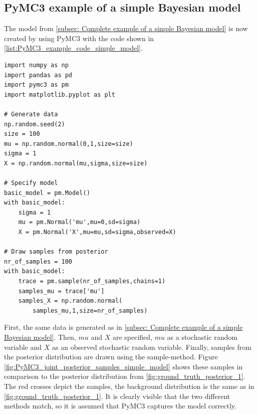 \documentclass{article}
\begin{document}
\subsection{PyMC3 example of a simple Bayesian model}
\label{subsec: PyMC3 example of a simple Bayesian model}
The model from \autoref{subsec: Complete example of a simple Bayesian model} is now created by using PyMC3 with the code shown in \autoref{list:PyMC3_example_code_simple_model}.\\
\begin{minipage}{\linewidth}
\begin{lstlisting}[caption={Code used to specify the example model in PyMC3}, label={list:PyMC3_example_code_simple_model},captionpos=b]
import numpy as np
import pandas as pd
import pymc3 as pm
import matplotlib.pyplot as plt
	
# Generate data
np.random.seed(2)
size = 100
mu = np.random.normal(0,1,size=size)
sigma = 1
X = np.random.normal(mu,sigma,size=size)
	
# Specify model
basic_model = pm.Model()
with basic_model:
    sigma = 1
    mu = pm.Normal('mu',mu=0,sd=sigma)
    X = pm.Normal('X',mu=mu,sd=sigma,observed=X)

# Draw samples from posterior
nr_of_samples = 100
with basic_model:
    trace = pm.sample(nr_of_samples,chains=1)
    samples_mu = trace['mu']
    samples_X = np.random.normal(
        samples_mu,1,size=nr_of_samples)
\end{lstlisting}
\end{minipage}
First, the same data is generated as in \autoref{subsec: Complete example of a simple Bayesian model}. Then, $mu$ and $X$ are specified, $mu$ as a stochastic random variable and $X$ as an observed stochastic random variable. Finally, samples from the posterior distribution are drawn using the sample-method. 
Figure \ref{fig:PyMC3_joint_posterior_samples_simple_model} shows these samples in comparison to the posterior distribution from \autoref{fig:ground_truth_posterior_1}. The red crosses depict the samples, the background distribution is the same as in \autoref{fig:ground_truth_posterior_1}. It is clearly visible that the two different methods match, so it is assumed that PyMC3 captures the model correctly.
\end{document}
